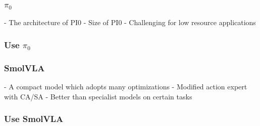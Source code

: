 \subsubsection{\( \pi_0 \)}
- The architecture of PI0
- Size of PI0
- Challenging for low resource applications

\subsubsection{Use \( \pi_0 \)}

\subsubsection{SmolVLA}
- A compact model which adopts many optimizations
- Modified action expert with CA/SA
- Better than specialist models on certain tasks

\subsubsection{Use SmolVLA}